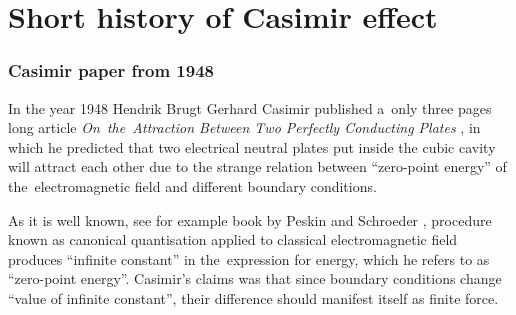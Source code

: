 \documentclass[10pt,t]{beamer}
\begin{document}
\section{Short history of Casimir effect}



\begin{frame}
  \frametitle{Casimir paper from 1948}


  In the year 1948 Hendrik Brugt Gerhard Casimir published a~only three
  pages long article \textit{On~the~Attraction Between Two Perfectly
    Conducting Plates}
  \parencite{Casimir-On-the-Attraction-Between-ETC-Pub-1948}, in
  which he predicted that two electrical neutral plates put inside the
  cubic cavity will attract each other due to the strange relation between
  ``zero-point energy'' of the~electromagnetic field and different
  boundary conditions.

  As it is well known, see for example book by Peskin and Schroeder
  \parencite{Peskin-Schroeder-An-Introduction-to-Quantum-Field-Theory-Pub-1995},
  procedure known as canonical quantisation applied to classical
  electromagnetic field produces ``infinite constant'' in the~expression
  for energy, which he refers to as ``zero-point energy''. Casimir's claims
  was that since boundary conditions change ``value of infinite constant'',
  their difference should manifest itself as finite force.

\end{frame}
\end{document}
